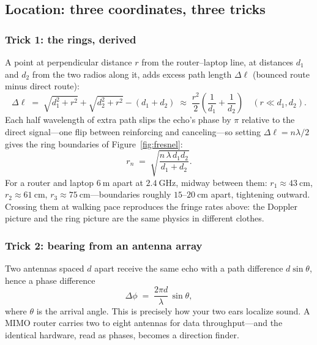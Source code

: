 \documentclass[11pt, letterpaper]{article}
\begin{document}
\subsection{Location: three coordinates, three tricks}

\subsubsection{Trick 1: the rings, derived}

A point at perpendicular distance $r$ from the router--laptop line, at distances $d_1$ and $d_2$ from the two radios along it, adds excess path length $\Delta\ell$ (bounced route minus direct route):
\begin{equation}
  \Delta\ell \;=\; \sqrt{d_1^2 + r^2} + \sqrt{d_2^2 + r^2} - (d_1 + d_2)
  \;\approx\; \frac{r^2}{2}\left(\frac{1}{d_1} + \frac{1}{d_2}\right)
  \quad (r \ll d_1, d_2).
\end{equation}
Each half wavelength of extra path slips the echo's phase by $\pi$ relative to the direct signal---one flip between reinforcing and canceling---so setting $\Delta\ell = n\lambda/2$ gives the ring boundaries of Figure~\ref{fig:fresnel}:
\begin{equation}
  r_n \;=\; \sqrt{\frac{n\,\lambda\, d_1 d_2}{d_1 + d_2}} .
\end{equation}
For a router and laptop $6\ \text{m}$ apart at $2.4\ \text{GHz}$, midway between them: $r_1 \approx 43\ \text{cm}$, $r_2 \approx 61\ \text{cm}$, $r_3 \approx 75\ \text{cm}$---boundaries roughly $15$--$20\ \text{cm}$ apart, tightening outward. Crossing them at walking pace reproduces the fringe rates above: the Doppler picture and the ring picture are the same physics in different clothes.

\subsubsection{Trick 2: bearing from an antenna array}

Two antennas spaced $d$ apart receive the same echo with a path difference $d\sin\theta$, hence a phase difference
\begin{equation}
  \Delta\phi \;=\; \frac{2\pi d}{\lambda}\, \sin\theta ,
\end{equation}
where $\theta$ is the arrival angle. This is precisely how your two ears localize sound. A MIMO router carries two to eight antennas for data throughput---and the identical hardware, read as phases, becomes a direction finder.
\end{document}
